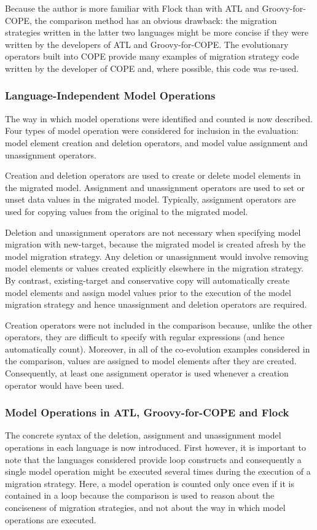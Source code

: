 Because the author is more familiar with Flock than with ATL and Groovy-for-COPE, the comparison method has an obvious drawback: the migration strategies written in the latter two languages might be more concise if they were written by the developers of ATL and Groovy-for-COPE. The evolutionary operators built into COPE provide many examples of migration strategy code written by the developer of COPE and, where possible, this code was re-used.

\subsubsection{Language-Independent Model Operations}
\label{subsubsec:quantitive_model_operations}
The way in which model operations were identified and counted is now described. Four types of model operation were considered for inclusion in the evaluation: model element creation and deletion operators, and model value assignment and unassignment operators. 

Creation and deletion operators are used to create or delete model elements in the migrated model. Assignment and unassignment operators are used to set or unset data values in the migrated model. Typically, assignment operators are used for copying values from the original to the migrated model. 

Deletion and unassignment operators are not necessary when specifying model migration with new-target, because the migrated model is created afresh by the model migration strategy. Any deletion or unassignment would involve removing model elements or values created explicitly elsewhere in the migration strategy. By contrast, existing-target and conservative copy will automatically create model elements and assign model values prior to the execution of the model migration strategy and hence unassignment and deletion operators are required.

Creation operators were not included in the comparison because, unlike the other operators, they are difficult to specify with regular expressions (and hence automatically count). Moreover, in all of the co-evolution examples considered in the comparison, values are assigned to model elements after they are created. Consequently, at least one assignment operator is used whenever a creation operator would have been used.

\subsubsection{Model Operations in ATL, Groovy-for-COPE and Flock}
\label{subsubsec:quantitive_model_operations_concrete}
The concrete syntax of the deletion, assignment and unassignment model operations in each language is now introduced. First however, it is important to note that the languages considered provide loop constructs and consequently a single model operation might be executed several times during the execution of a migration strategy. Here, a model operation is counted only once even if it is contained in a loop because the comparison is used to reason about the conciseness of migration strategies, and not about the way in which model operations are executed.

